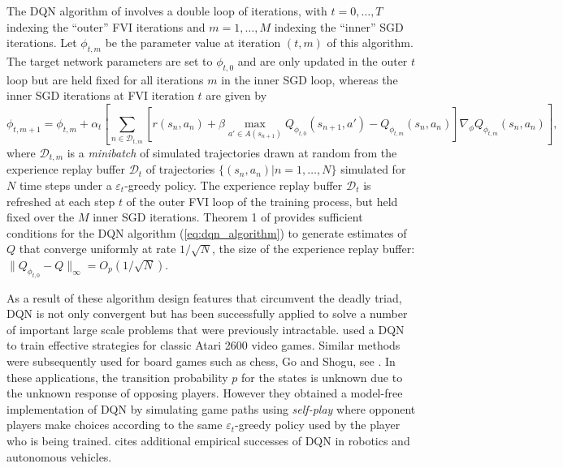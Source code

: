The DQN algorithm of \citet{Zhang:2023} involves a double loop of iterations, with $t=0,\ldots,T$ indexing the ``outer''
FVI iterations and $m=1,\ldots,M$ indexing the ``inner'' SGD iterations. Let $\phi_{t,m}$ be the parameter
value at iteration $(t,m)$ of this algorithm. The target network parameters are set to $\phi_{t,0}$ and are only
updated in the outer $t$ loop but are held fixed for all iterations $m$ in the inner SGD loop, whereas the inner
SGD iterations at FVI iteration $t$ are given by
\begin{equation}
     \phi_{t,m+1}=\phi_{t,m}+\alpha_t \left[\sum_{n \in \mathcal{D}_{t,m}} \left[r(s_n,a_n)+\beta \max_{a' \in A(s_{n+1})}
Q_{\phi_{t,0}}(s_{n+1},a')-Q_{\phi_{t,m}}(s_n,a_n)\right]\nabla_\phi Q_{\phi_{t,m}}(s_n,a_n)\right],
\label{eq:dqn_algorithm}
\end{equation}
where $\mathcal{D}_{t,m}$ is a {\it minibatch\/} of simulated trajectories drawn at random from 
the experience replay buffer $\mathcal{D}_t$ of trajectories $\{(s_n,a_n)|n=1,\ldots,N\}$ simulated for $N$ time steps
under a $\varepsilon_t$-greedy policy. The experience replay buffer $\mathcal{D}_t$ is refreshed at each step $t$ of the outer FVI
loop of the training process, but held fixed over the $M$ inner SGD iterations. Theorem 1 of \citet{Zhang:2023}
provides sufficient conditions for the DQN algorithm (\ref{eq:dqn_algorithm}) to generate estimates of $Q$ that
converge uniformly at rate $1/\sqrt{N}$, the size of the experience replay buffer: $\|Q_{\phi_{t,0}}-Q\|_\infty=O_p(1/\sqrt{N})$.

As a result of these algorithm design features that circumvent the deadly triad, DQN is not only convergent 
but has been successfully applied to solve a number of important large scale problems that were previously intractable.
\citet{mnih:2015} used a DQN to train effective strategies
for classic Atari 2600 video games. Similar methods were subsequently used for
board games such as chess, Go and Shogu, see \citet{Silver:2018}. In these applications, the transition probability
$p$ for the states is unknown due to the unknown response of opposing players. However 
they obtained a model-free implementation of DQN  by simulating game paths using {\it self-play\/} where
opponent players make choices according to the same $\varepsilon_t$-greedy policy used by the player
who is being trained. \citet{Zhang:2023} cites additional empirical successes of DQN in robotics and autonomous
vehicles.


